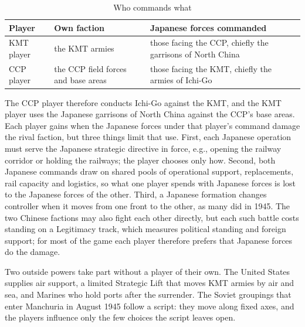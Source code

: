 \documentclass[11pt]{article}
\begin{document}
\begin{table}[ht]
\centering\small
\begin{tabular}{@{}lll@{}}
\toprule
Player & Own faction & Japanese forces commanded \\
\midrule
KMT player & the KMT armies & those facing the CCP, chiefly the garrisons of North China \\
CCP player & the CCP field forces and base areas & those facing the KMT, chiefly the armies of Ichi-Go \\
\bottomrule
\end{tabular}
\caption{Who commands what}\label{tab:intro-control}
\end{table}

The CCP player therefore conducts Ichi-Go against the KMT, and the KMT player uses the Japanese garrisons of North China against the CCP's base areas. Each player gains when the Japanese forces under that player's command damage the rival faction, but three things limit that use. First, each Japanese operation must serve the Japanese strategic directive in force, e.g., opening the railway corridor or holding the railways; the player chooses only how. Second, both Japanese commands draw on shared pools of operational support, replacements, rail capacity and logistics, so what one player spends with Japanese forces is lost to the Japanese forces of the other. Third, a Japanese formation changes controller when it moves from one front to the other, as many did in 1945. The two Chinese factions may also fight each other directly, but each such battle costs standing on a Legitimacy track, which measures political standing and foreign support; for most of the game each player therefore prefers that Japanese forces do the damage.

Two outside powers take part without a player of their own. The United States supplies air support, a limited Strategic Lift that moves KMT armies by air and sea, and Marines who hold ports after the surrender. The Soviet groupings that enter Manchuria in August 1945 follow a script: they move along fixed axes, and the players influence only the few choices the script leaves open.
\end{document}
